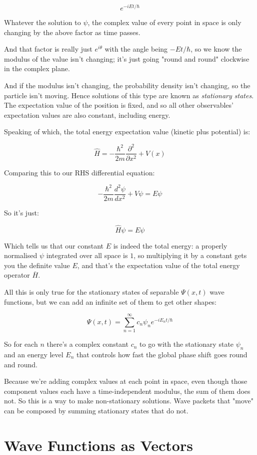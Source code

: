 $$
e^{-iEt/\hbar}
$$

Whatever the solution to $\psi$, the complex value of every point in space is only changing by the above factor as time passes.

And that factor is really just $e^{i\theta}$ with the angle being $-Et/\hbar$, so we know the modulus of the value isn't changing; it's just going "round and round" clockwise in the complex plane.

And if the modulus isn't changing, the probability density isn't changing, so the particle isn't moving. Hence solutions of this type are known as \textit{stationary states}. The expectation value of the position is fixed, and so all other observables' expectation values are also constant, including energy.

Speaking of which, the total energy expectation value (kinetic plus potential) is:

$$
\hat{H} =
-\frac{\hbar^2}{2m}
\frac{\partial^2}{\partial x^2}
+ V(x)
$$

Comparing this to our RHS differential equation:

$$
- \frac{\hbar^2}{2m}
\frac{d^2 \psi}{d x^2}
+ V\psi
=
E\psi
$$

So it's just:

$$
\hat{H}\psi
=
E\psi
$$

Which tells us that our constant $E$ is indeed the total energy: a properly normalised $\psi$ integrated over all space is $1$, so multiplying it by a constant gets you the definite value $E$, and that's the expectation value of the total energy operator $\bar{H}$.

All this is only true for the stationary states of separable $\Psi(x, t)$ wave functions, but we can add an infinite set of them to get other shapes:

$$
\Psi(x, t)
=
\sum_{n=1}^\infty
c_n
\psi_n
e^{-iE_nt/\hbar}
$$

So for each $n$ there's a complex constant $c_n$ to go with the stationary state $\psi_n$ and an energy level $E_n$ that controls how fast the global phase shift goes round and round.

Because we're adding complex values at each point in space, even though those component values each have a time-independent modulus, the sum of them does not. So this is a way to make non-stationary solutions. Wave packets that "move" can be composed by summing stationary states that do not.

\section{Wave Functions as Vectors}

